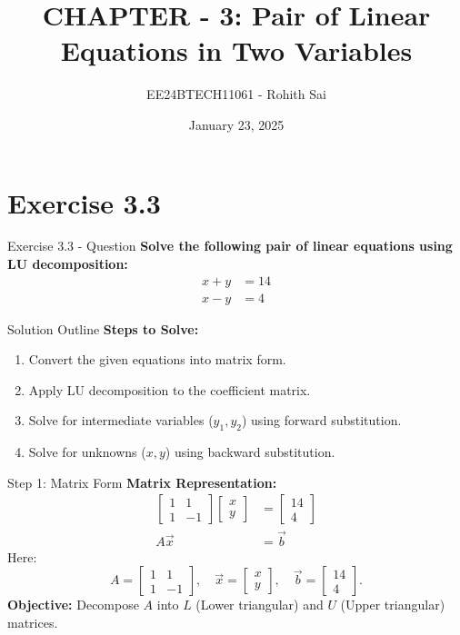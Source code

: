 \documentclass{beamer}
\title{CHAPTER - 3: Pair of Linear Equations in Two Variables}
\author{EE24BTECH11061 - Rohith Sai}
\date{January 23, 2025}
\newcommand{\myvec}[1]{\begin{bmatrix}#1\end{bmatrix}}
\begin{document}
\frame{\titlepage}

\section*{Exercise 3.3}

\begin{frame}{Exercise 3.3 - Question}
\textbf{Solve the following pair of linear equations using LU decomposition:}
\begin{align*}
    x + y &= 14 \\
    x - y &= 4
\end{align*}
\end{frame}

\begin{frame}{Solution Outline}
\textbf{Steps to Solve:}
\begin{enumerate}
    \item Convert the given equations into matrix form.
    \item Apply LU decomposition to the coefficient matrix.
    \item Solve for intermediate variables (\(y_1, y_2\)) using forward substitution.
    \item Solve for unknowns (\(x, y\)) using backward substitution.
\end{enumerate}
\end{frame}

\begin{frame}{Step 1: Matrix Form}
\textbf{Matrix Representation:}
\begin{align*}
    \myvec{1 & 1 \\ 1 & -1}\myvec{x \\ y} &= \myvec{14 \\ 4} \\
    A\vec{x} &= \vec{b}
\end{align*}
Here:
\[
    A = \myvec{1 & 1 \\ 1 & -1}, \quad \vec{x} = \myvec{x \\ y}, \quad \vec{b} = \myvec{14 \\ 4}.
\]
\textbf{Objective:} Decompose $A$ into $L$ (Lower triangular) and $U$ (Upper triangular) matrices.
\end{frame}
\end{document}
